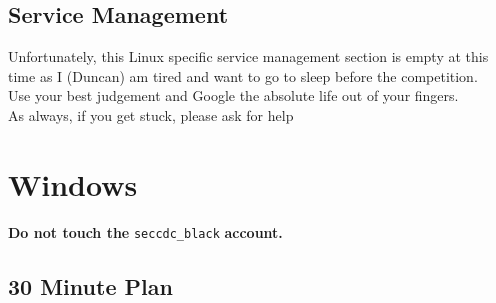 \documentclass[12pt,letterpaper]{article}
\def\code#1{\textcolor{iris}{\texttt{#1}}}
\def\bf#1{\textbf{#1}}
\begin{document}
\subsection{Service Management}

Unfortunately, this Linux specific service management section is empty at this time as I (Duncan) am tired and want to go to sleep before the competition. \\
Use your best judgement and Google the absolute life out of your fingers. \\
As always, if you get stuck, please ask for help

\pagebreak

\section{Windows}

\bf{Do not touch the} \code{seccdc\_black} \bf{account.}

\subsection{30 Minute Plan}
\end{document}
